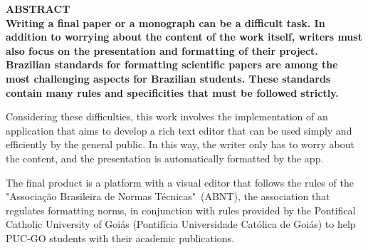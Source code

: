 \documentclass[12pt,a4paper,oneside,brazil]{abntex2}
\begin{document}
\centering
\ABNTEXchapterfont\bfseries{\textsc{\MakeUppercase{Abstract}}}\\
\vspace*{3cm}
\justifying
\normalfont
Writing a final paper or a monograph can be a difficult task. In addition to worrying about the content of the work itself, writers must also focus on the presentation and formatting of their project. Brazilian standards for formatting scientific papers are among the most challenging aspects for Brazilian students. These standards contain many rules and specificities that must be followed strictly.

Considering these difficulties, this work involves the implementation of an application that aims to develop a rich text editor that can be used simply and efficiently by the general public. In this way, the writer only has to worry about the content, and the presentation is automatically formatted by the app.

The final product is a platform with a visual editor that follows the rules of the "Associação Brasileira de Normas Técnicas"~(ABNT), the association that regulates formatting norms, in conjunction with rules provided by the Pontifical Catholic University of Goiás (Pontifícia Universidade Católica de Goiás) to help PUC-GO students with their academic publications.

\clearpage


\listoffigures   %
\clearpage

\listoftables    %
\clearpage




\tableofcontents
\clearpage



\setcounter{page}{1}
\textual

\justifying
\normalfont






\end{document}
